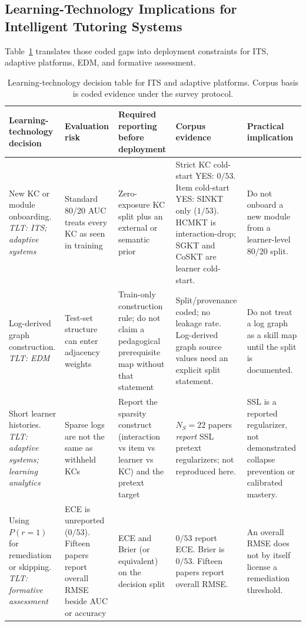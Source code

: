 \documentclass[lettersize,journal]{IEEEtran}
\begin{document}
\subsection{Learning-Technology Implications for Intelligent Tutoring Systems}
Table~\ref{tab:its_implications} translates those coded gaps into deployment constraints for ITS, adaptive platforms, EDM, and formative assessment.
\begin{table}[t]
\caption{Learning-technology decision table for ITS and adaptive platforms. Corpus basis is coded evidence under the survey protocol.}
\label{tab:its_implications}
\centering
\footnotesize
\setlength{\tabcolsep}{2.8pt}
\begin{tabular}{@{}>{\raggedright\arraybackslash}p{}
>{\raggedright\arraybackslash}p{}
>{\raggedright\arraybackslash}p{}
>{\raggedright\arraybackslash}p{}
>{\raggedright\arraybackslash}p{}@{}}
\toprule
\textbf{Learning-technology decision} & \textbf{Evaluation risk} & \textbf{Required reporting before deployment} & \textbf{Corpus evidence} & \textbf{Practical implication} \\
\midrule
New KC or module onboarding.
\textit{TLT: ITS; adaptive systems} & Standard 80/20 AUC treats every KC as seen in training & Zero-exposure KC split plus an external or semantic prior & Strict KC cold-start YES: $0/53$. Item cold-start YES: SINKT only ($1/53$). HCMKT is interaction-drop; SGKT and CoSKT are learner cold-start. & Do not onboard a new module from a learner-level 80/20 split. \\
Log-derived graph construction.
\textit{TLT: EDM} & Test-set structure can enter adjacency weights & Train-only construction rule; do not claim a pedagogical prerequisite map without that statement & Split/provenance coded; no leakage rate. Log-derived graph source values need an explicit split statement. & Do not treat a log graph as a skill map until the split is documented. \\
Short learner histories.
\textit{TLT: adaptive systems; learning analytics} & Sparse logs are not the same as withheld KCs & Report the sparsity construct (interaction vs item vs learner vs KC) and the pretext target & $N_S=22$ papers \emph{report} SSL pretext regularizers; not reproduced here. & SSL is a reported regularizer, not demonstrated collapse prevention or calibrated mastery. \\
Using $P(r=1)$ for remediation or skipping.
\textit{TLT: formative assessment} & ECE is unreported ($0/53$). Fifteen papers report overall RMSE beside AUC or accuracy & ECE and Brier (or equivalent) on the decision split & $0/53$ report ECE. Brier is $0/53$. Fifteen papers report overall RMSE. & An overall RMSE does not by itself license a remediation threshold. \\

\end{tabular}
\end{table}
\end{document}
